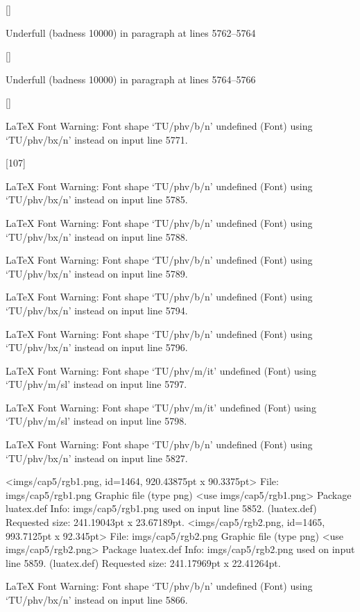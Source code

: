  []


Underfull \hbox (badness 10000) in paragraph at lines 5762--5764

 []


Underfull \hbox (badness 10000) in paragraph at lines 5764--5766

 []


LaTeX Font Warning: Font shape `TU/phv/b/n' undefined
(Font)              using `TU/phv/bx/n' instead on input line 5771.

[107]

LaTeX Font Warning: Font shape `TU/phv/b/n' undefined
(Font)              using `TU/phv/bx/n' instead on input line 5785.


LaTeX Font Warning: Font shape `TU/phv/b/n' undefined
(Font)              using `TU/phv/bx/n' instead on input line 5788.


LaTeX Font Warning: Font shape `TU/phv/b/n' undefined
(Font)              using `TU/phv/bx/n' instead on input line 5789.


LaTeX Font Warning: Font shape `TU/phv/b/n' undefined
(Font)              using `TU/phv/bx/n' instead on input line 5794.


LaTeX Font Warning: Font shape `TU/phv/b/n' undefined
(Font)              using `TU/phv/bx/n' instead on input line 5796.


LaTeX Font Warning: Font shape `TU/phv/m/it' undefined
(Font)              using `TU/phv/m/sl' instead on input line 5797.


LaTeX Font Warning: Font shape `TU/phv/m/it' undefined
(Font)              using `TU/phv/m/sl' instead on input line 5798.


LaTeX Font Warning: Font shape `TU/phv/b/n' undefined
(Font)              using `TU/phv/bx/n' instead on input line 5827.

<imgs/cap5/rgb1.png, id=1464, 920.43875pt x 90.3375pt>
File: imgs/cap5/rgb1.png Graphic file (type png)
<use imgs/cap5/rgb1.png>
Package luatex.def Info: imgs/cap5/rgb1.png  used on input line 5852.
(luatex.def)             Requested size: 241.19043pt x 23.67189pt.
<imgs/cap5/rgb2.png, id=1465, 993.7125pt x 92.345pt>
File: imgs/cap5/rgb2.png Graphic file (type png)
<use imgs/cap5/rgb2.png>
Package luatex.def Info: imgs/cap5/rgb2.png  used on input line 5859.
(luatex.def)             Requested size: 241.17969pt x 22.41264pt.

LaTeX Font Warning: Font shape `TU/phv/b/n' undefined
(Font)              using `TU/phv/bx/n' instead on input line 5866.



